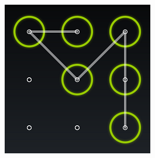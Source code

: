     \begin{figure}[H]
        \centering
        \includegraphics[scale=0.8]{pics/patternLock.png}
    \end{figure}





